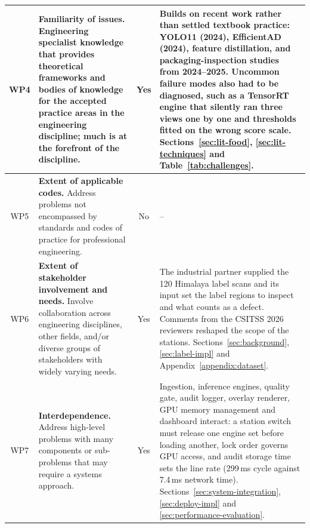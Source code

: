 \begin{table}[htbp]
\begin{tabularx}{\textwidth}{|c|L{4.4cm}|c|X|}
WP4 & \textbf{Familiarity of issues.} Engineering specialist knowledge that provides theoretical frameworks and bodies of knowledge for the accepted practice areas in the engineering discipline; much is at the forefront of the discipline. & Yes & Builds on recent work rather than settled textbook practice: YOLO11 (2024), EfficientAD (2024), feature distillation, and packaging-inspection studies from 2024--2025. Uncommon failure modes also had to be diagnosed, such as a TensorRT engine that silently ran three views one by one and thresholds fitted on the wrong score scale. Sections~\ref{sec:lit-food}, \ref{sec:lit-techniques} and Table~\ref{tab:challenges}. \\ \hline
WP5 & \textbf{Extent of applicable codes.} Address problems not encompassed by standards and codes of practice for professional engineering. & No & -- \\ \hline
WP6 & \textbf{Extent of stakeholder involvement and needs.} Involve collaboration across engineering disciplines, other fields, and/or diverse groups of stakeholders with widely varying needs. & Yes & The industrial partner supplied the 120 Himalaya label scans and its input set the label regions to inspect and what counts as a defect. Comments from the CSITSS 2026 reviewers reshaped the scope of the stations. Sections~\ref{sec:background}, \ref{sec:label-impl} and Appendix~\ref{appendix:dataset}. \\ \hline
WP7 & \textbf{Interdependence.} Address high-level problems with many components or sub-problems that may require a systems approach. & Yes & Ingestion, inference engines, quality gate, audit logger, overlay renderer, GPU memory management and dashboard interact: a station switch must release one engine set before loading another, lock order governs GPU access, and audit storage time sets the line rate (299\,ms cycle against 7.4\,ms network time). Sections~\ref{sec:system-integration}, \ref{sec:deploy-impl} and \ref{sec:performance-evaluation}. \\ \hline
\end{tabularx}
\end{table}

